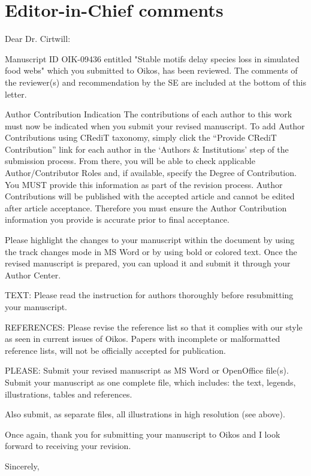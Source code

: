 \documentclass[12pt]{article}
\begin{document}
\section*{Editor-in-Chief comments}

  Dear Dr. Cirtwill:

  Manuscript ID OIK-09436 entitled "Stable motifs delay species loss in simulated food webs" which you submitted to Oikos, has been reviewed.  The comments of the reviewer(s) and recommendation by the SE are included at the bottom of this letter.


  Author Contribution Indication
  The contributions of each author to this work must now be indicated when you submit your revised manuscript. To add Author Contributions using CRediT taxonomy, simply click the ``Provide CRediT Contribution'' link for each author in the `Authors \& Institutions' step of the submission process. From there, you will be able to check applicable Author/Contributor Roles and, if available, specify the Degree of Contribution. You MUST provide this information as part of the revision process. Author Contributions will be published with the accepted article and cannot be edited after article acceptance. Therefore you must ensure the Author Contribution information you provide is accurate prior to final acceptance.


  Please highlight the changes to your manuscript within the document by using the track changes mode in MS Word or by using bold or colored text. Once the revised manuscript is prepared, you can upload it and submit it through your Author Center.


  TEXT: Please read the instruction for authors thoroughly before resubmitting your manuscript.

  REFERENCES: Please revise the reference list so that it complies with our style as seen in current issues of Oikos. Papers with incomplete or malformatted reference lists, will not be officially accepted for publication.

  PLEASE: Submit your revised manuscript as MS Word or OpenOffice file(s). Submit your manuscript as one complete file, which includes: the text, legends, illustrations, tables and references.

  Also submit, as separate files, all illustrations in high resolution (see above).

  Once again, thank you for submitting your manuscript to Oikos and I look forward to receiving your revision.

  Sincerely,
\end{document}
